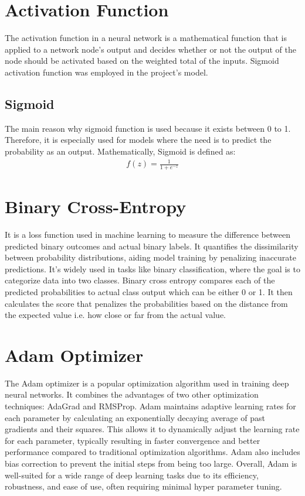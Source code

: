 \section{Activation Function}
\vspace{-18pt}
The activation function in a neural network is a mathematical function that is applied to a network node's output and decides whether or not the output of the node should be activated based on the weighted total of the inputs. Sigmoid activation function was employed in the project's model.
\subsection{Sigmoid}
\vspace{-18pt}
The main reason why sigmoid function is used because it exists between 0 to 1. Therefore, it is especially used for models where the need is to predict the probability as an output.  Mathematically, Sigmoid is defined as: 
\begin{eqnarray}
	f(z) = \frac{1}{1 + e^{-z}}
\end{eqnarray}
\section{Binary Cross-Entropy}
\vspace{-18pt}
It is a loss function used in machine learning to measure the difference between predicted binary outcomes and actual binary labels. It quantifies the dissimilarity between probability distributions, aiding model training by penalizing inaccurate predictions. It’s widely used in tasks like binary classification, where the goal is to categorize data into two classes. Binary cross entropy compares each of the predicted probabilities to actual class output which can be either 0 or 1. It then calculates the score that penalizes the probabilities based on the distance from the expected value i.e. how close or far from the actual value.
\section{Adam Optimizer}
\vspace{-18pt}
The Adam optimizer is a popular optimization algorithm used in training deep neural networks. It combines the advantages of two other optimization techniques: AdaGrad and RMSProp. Adam maintains adaptive learning rates for each parameter by calculating an exponentially decaying average of past gradients and their squares. This allows it to dynamically adjust the learning rate for each parameter, typically resulting in faster convergence and better performance compared to traditional optimization algorithms. Adam also includes bias correction to prevent the initial steps from being too large. Overall, Adam is well-suited for a wide range of deep learning tasks due to its efficiency, robustness, and ease of use, often requiring minimal hyper parameter tuning.
